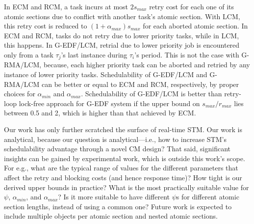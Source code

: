 \documentclass[conference]{IEEEtran}
\begin{document}
In ECM and RCM, a task incurs at most $2s_{max}$ retry cost for each one of its atomic sections due to conflict
with another task's atomic section. With LCM, this retry cost is reduced to $(1+\alpha_{max})s_{max}$ for each aborted atomic section. In ECM and RCM, tasks do not retry due to lower priority tasks, while in LCM, this happens. In G-EDF/LCM, retrial due to lower priority job is encountered only from a task $\tau_{j}$'s last instance during $\tau_{i}$'s period. This is not the case with G-RMA/LCM, because,  each higher priority task can be aborted and retried by any instance of lower priority tasks. Schedulability of G-EDF/LCM and G-RMA/LCM can be better or equal to ECM and RCM, respectively, by proper choices for $\alpha_{min}$ and $\alpha_{max}$. Schedulability of G-EDF/LCM is better than retry-loop lock-free approach for G-EDF system if the upper bound on $s_{max}/r_{max}$ lies between 0.5 and 2, which is higher than that achieved by ECM.

Our work has only further scratched the surface of real-time STM. Our work is analytical, because our question is analytical---i.e., how to increase STM's schedulability advantage through a novel CM design? That said, significant insights can be gained by experimental work, which is outside this work's  scope. For e.g., what are the typical range of values for the different parameters that affect the retry and blocking costs (and hence response time)? How tight is our derived upper bounds in practice? 
What is the most practically suitable
value for $\psi$, $\alpha_{min}$, and $\alpha_{max}$? Is it more suitable to have different $\psi$s for different atomic section lengths, instead of using a common one? Future work is expected to include multiple objects per atomic section and nested atomic sections.


%
%



\end{document}
